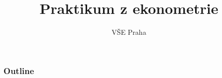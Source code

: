 \documentclass{beamer}
\title[Týden 3]{Praktikum z ekonometrie} %
\author{VŠE Praha} %
\institute[4EK417] %
{
\medskip
\textit{Tomáš Formánek} %
}
\date{} %
\begin{document}
\begin{frame}
\titlepage %
\end{frame}

\begin{frame}
\frametitle{Outline} %
\tableofcontents %
\end{frame}

\end{document}
